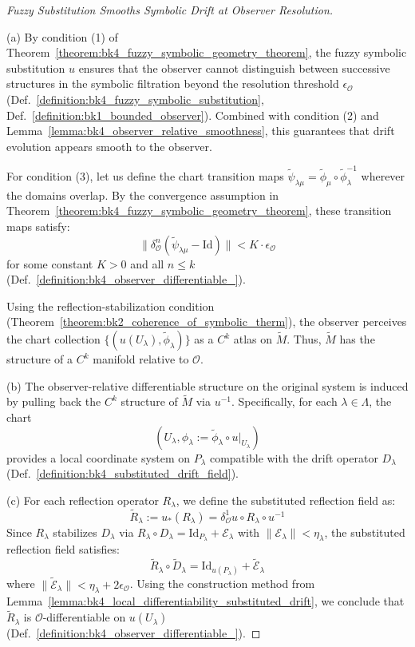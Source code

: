\begin{proof}[Fuzzy Substitution Smooths Symbolic Drift at Observer Resolution]
\label{proof:bk4_fuzzy_substitution_drift_smoothing}
\leavevmode

(a) By condition (1) of Theorem~\ref{theorem:bk4_fuzzy_symbolic_geometry_theorem}, the fuzzy symbolic substitution $u$ ensures that the observer cannot distinguish between successive structures in the symbolic filtration beyond the resolution threshold $\epsilon_\mathcal{O}$ (Def.~\ref{definition:bk4_fuzzy_symbolic_substitution}, Def.~\ref{definition:bk1_bounded_observer}). Combined with condition (2) and Lemma~\ref{lemma:bk4_observer_relative_smoothness}, this guarantees that drift evolution appears smooth to the observer.

For condition (3), let us define the chart transition maps $\tilde{\psi}_{\lambda\mu} = \tilde{\phi}_\mu \circ \tilde{\phi}_\lambda^{-1}$ wherever the domains overlap. By the convergence assumption in Theorem~\ref{theorem:bk4_fuzzy_symbolic_geometry_theorem}, these transition maps satisfy:
\[
\|\delta^n_\mathcal{O}(\tilde{\psi}_{\lambda\mu} - \text{Id})\| < K \cdot \epsilon_\mathcal{O}
\]
for some constant $K > 0$ and all $n \leq k$ (Def.~\ref{definition:bk4_observer_differentiable_}).

Using the reflection-stabilization condition (Theorem~\ref{theorem:bk2_coherence_of_symbolic_therm}), the observer perceives the chart collection $\{(u(U_\lambda), \tilde{\phi}_\lambda)\}$ as a $C^k$ atlas on $\tilde{M}$. Thus, $\tilde{M}$ has the structure of a $C^k$ manifold relative to $\mathcal{O}$.

(b) The observer-relative differentiable structure on the original system is induced by pulling back the $C^k$ structure of $\tilde{M}$ via $u^{-1}$. Specifically, for each $\lambda \in \Lambda$, the chart
\[
(U_\lambda, \phi_\lambda := \tilde{\phi}_\lambda \circ u|_{U_\lambda})
\]
provides a local coordinate system on $P_\lambda$ compatible with the drift operator $D_\lambda$ (Def.~\ref{definition:bk4_substituted_drift_field}).

(c) For each reflection operator $R_\lambda$, we define the substituted reflection field as:
\[
\tilde{R}_\lambda := u_*(R_\lambda) = \delta^1_\mathcal{O}u \circ R_\lambda \circ u^{-1}
\]
Since $R_\lambda$ stabilizes $D_\lambda$ via $R_\lambda \circ D_\lambda = \text{Id}_{P_\lambda} + \mathcal{E}_\lambda$ with $\|\mathcal{E}_\lambda\| < \eta_\lambda$, the substituted reflection field satisfies:
\[
\tilde{R}_\lambda \circ \tilde{D}_\lambda = \text{Id}_{u(P_\lambda)} + \tilde{\mathcal{E}}_\lambda
\]
where $\|\tilde{\mathcal{E}}_\lambda\| < \eta_\lambda + 2\epsilon_\mathcal{O}$. Using the construction method from Lemma~\ref{lemma:bk4_local_differentiability_substituted_drift}, we conclude that $\tilde{R}_\lambda$ is $\mathcal{O}$-differentiable on $u(U_\lambda)$ (Def.~\ref{definition:bk4_observer_differentiable_}).

\end{proof}

